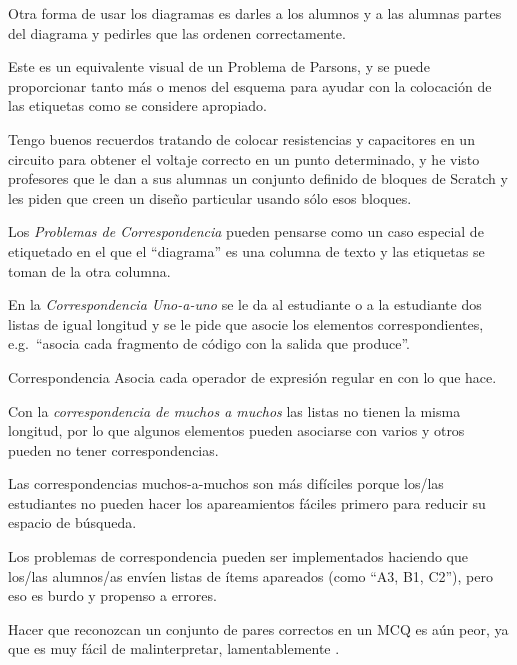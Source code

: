 

Otra forma de usar los diagramas es darles a los alumnos y a las alumnas partes del diagrama y pedirles que las ordenen correctamente.

Este es un equivalente visual de un Problema de Parsons, 
y se puede proporcionar tanto más o menos del esquema para ayudar con la colocación de las etiquetas como se considere apropiado.

Tengo buenos recuerdos tratando de colocar resistencias y capacitores en un circuito para obtener el voltaje correcto en un punto determinado, y he visto profesores que le dan a sus alumnas un conjunto definido de bloques de Scratch y les piden que creen un diseño particular usando sólo esos bloques.

Los \emph{Problemas de Correspondencia} pueden pensarse como un caso especial de etiquetado 
en el que el ``diagrama'' es una columna de texto 
y las etiquetas se toman de la otra columna.

En la \emph{Correspondencia Uno-a-uno} se le da al estudiante o a la estudiante dos listas de igual longitud y se le pide que asocie los elementos correspondientes, 
e.g.\ ``asocia cada fragmento de código con la salida que produce''.

\begin{aside}{Correspondencia}
  Asocia cada operador de expresión regular en 
  con lo que hace.
\end{aside}


Con la \emph{correspondencia de muchos a muchos} las listas no tienen la misma longitud, por lo que algunos elementos pueden asociarse con varios
y otros pueden no tener correspondencias.

Las correspondencias muchos-a-muchos son más difíciles 
porque los/las estudiantes no pueden hacer los apareamientos fáciles primero para reducir su espacio de búsqueda.

Los problemas de correspondencia pueden ser implementados haciendo que los/las alumnos/as envíen listas de ítems apareados 
(como ``A3, B1, C2''), 
pero eso es burdo y propenso a errores.

Hacer que reconozcan un conjunto de pares correctos en un MCQ es aún peor, 
ya que es muy fácil de malinterpretar, lamentablemente .

